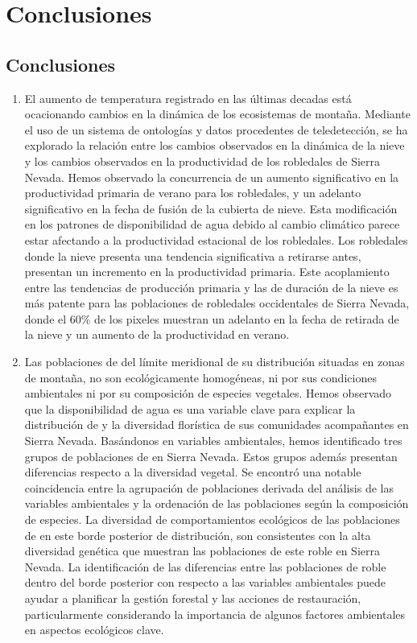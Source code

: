 %
\chapter{\textcolor{ctcolormain}{Conclusiones}}\label{sec:conclussions}
\newpage

\section{Conclusiones}\label{sec:conclussions:es}

\begin{enumerate}
\renewcommand{\labelenumi}{\textbf{\textcolor{ctcolormain}{\arabic{enumi}.}}}
    \item El aumento de temperatura registrado en las últimas decadas está ocacionando cambios en la dinámica de los ecosistemas de montaña. Mediante el uso de un sistema de ontologías y datos procedentes de teledetección, se ha explorado la relación entre los cambios observados en la dinámica de la nieve y los cambios observados en la productividad de los robledales de Sierra Nevada. Hemos observado la concurrencia de un aumento significativo en la productividad primaria de verano para los robledales, y un adelanto significativo en la fecha de fusión de la cubierta de nieve. Esta modificación en los patrones de disponibilidad de agua debido al cambio climático parece estar afectando a la productividad estacional de los robledales. Los robledales donde la nieve presenta una tendencia significativa a retirarse antes, presentan un incremento en la productividad primaria. Este acoplamiento entre las tendencias de producción primaria y las de duración de la nieve es más patente para las poblaciones de robledales occidentales de Sierra Nevada, donde el 60\% de los pixeles muestran un adelanto en la fecha de retirada de la nieve y un aumento de la productividad en verano. 
    
    \item Las poblaciones de \Qpy del límite meridional de su distribución situadas en zonas de montaña, no son ecológicamente homogéneas, ni por sus condiciones ambientales ni por su composición de especies vegetales. Hemos observado que la disponibilidad de agua es una variable clave para explicar la distribución de \Qp y la diversidad florística de sus comunidades acompañantes en Sierra Nevada. Basándonos en variables ambientales, hemos identificado tres grupos de poblaciones de \Qp en Sierra Nevada. Estos grupos además presentan diferencias respecto a la diversidad vegetal. Se encontró una notable coincidencia entre la agrupación de poblaciones derivada del análisis de las variables ambientales y la ordenación de las poblaciones según la composición de especies. La diversidad de comportamientos ecológicos de las poblaciones de \Qp en este borde posterior de distribución, son consistentes con la alta diversidad genética que muestran las poblaciones de este roble en Sierra Nevada. La identificación de las diferencias entre las poblaciones de roble dentro del borde posterior con respecto a las variables ambientales puede ayudar a planificar la gestión forestal y las acciones de restauración, particularmente considerando la importancia de algunos factores ambientales en aspectos ecológicos clave.
    

\end{enumerate}
